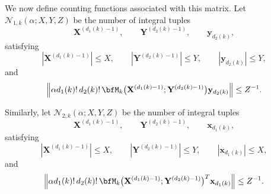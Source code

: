 \documentclass[12pt,reqno]{amsart}
\theoremstyle{definition}
\theoremstyle{remark}
\numberwithin{equation}{section}
\def\bfx{{\mathbf x}}
\def\bfy{{\mathbf y}}
\def\bfX{{\mathbf X}}
\def\bfY{{\mathbf Y}}
\begin{document}
We now define counting functions associated with this matrix. Let
$\mathcal N_{1,k}(\alpha;X,Y,Z)$ be the number of integral tuples
\[
    \bfX^{(d_1(k)-1)},
    \qquad
    \bfY^{(d_2(k)-1)},
    \qquad
    \bfy_{d_2(k)},
\]
satisfying
\[
    \left|\bfX^{(d_1(k)-1)}\right|\leq X,
    \qquad
    \left|\bfY^{(d_2(k)-1)}\right|\leq Y,
    \qquad
    \left|\bfy_{d_2(k)}\right|\leq Y,
\]
and
\[
\left\|
    \alpha d_1(k)!\,d_2(k)!\,
    \bfM_k
    \bigl(
        \bfX^{(d_1(k)-1)};
        \bfY^{(d_2(k)-1)}
    \bigr)
    \bfy_{d_2(k)}
\right\|
\leq Z^{-1}.
\]

Similarly, let $\mathcal N_{2,k}(\alpha;X,Y,Z)$ be the number of
integral tuples
\[
    \bfX^{(d_1(k)-1)},
    \qquad
    \bfY^{(d_2(k)-1)},
    \qquad
    \bfx_{d_1(k)},
\]
satisfying
\[
    \left|\bfX^{(d_1(k)-1)}\right|\leq X,
    \qquad
    \left|\bfY^{(d_2(k)-1)}\right|\leq Y,
    \qquad
    \left|\bfx_{d_1(k)}\right|\leq X,
\]
and
\[
\left\|
    \alpha d_1(k)!\,d_2(k)!\,
    \bfM_k
    \bigl(
        \bfX^{(d_1(k)-1)};
        \bfY^{(d_2(k)-1)}
    \bigr)^T
    \bfx_{d_1(k)}
\right\|
\leq Z^{-1}.
\]
\end{document}
